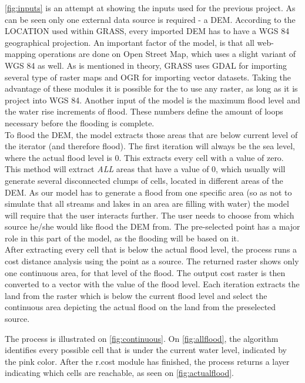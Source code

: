 \autoref{fig:inputs} is an attempt at showing the inputs used for the previous project. As can be seen only one external data source is required - a DEM. According to the LOCATION used within GRASS, every imported DEM has to have a WGS 84 geographical projection. An important factor of the model, is that all web-mapping operations are done on Open Street Map, which uses a slight variant of WGS 84 as well. As is mentioned in theory, GRASS uses GDAL for importing several type of raster maps and OGR for importing vector datasets. Taking the advantage of these modules it is possible for the to use any raster, as long as it is project into WGS 84. Another input of the model is the maximum flood level and the water rise increments of flood. These numbers define the amount of loops necessary before the flooding is complete.\\
To flood the DEM, the model extracts those areas that are below current level of the iterator (and therefore flood). The first iteration will always be the sea level, where the actual flood level is 0. This extracts every cell with a value of zero.  \\
This method will extract \emph{ALL} areas that have a value of 0, which usually will generate several disconnected clumps of cells, located in different areas of the DEM. As our model has to generate a flood from one specific area (so as not to simulate that all streams and lakes in an area are filling with water) the model will require that the user interacts further. The user needs to choose from which source he/she would like flood the DEM from. The pre-selected point has a major role in this part of the model, as the flooding will be based on it. \\

After extracting every cell that is below the actual flood level, the process runs a cost distance analysis using the point as a source. The returned raster shows only one continuous area, for that level of the flood. The output cost raster is then converted to a vector with the value of the flood level. Each iteration extracts the land from the raster which is below the current flood level and select the continuous area depicting the actual flood on the land from the preselected source. 

The process is illustrated on \autoref{fig:continuous}. On \autoref{fig:allflood}, the algorithm identifies every possible cell that is under the current water level, indicated by the pink color. After the r.cost module has finished, the process returns a layer indicating which cells are reachable, as seen on \autoref{fig:actualflood}.\\

